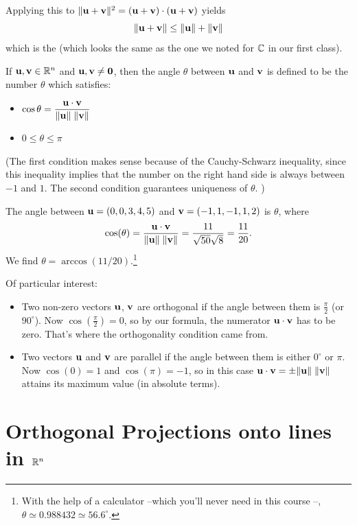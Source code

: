 Applying this to $\Vert \mathbf{u} + \mathbf{v} \Vert^2 = (\mathbf{u} + \mathbf{v})\cdot(\mathbf{u}+\mathbf{v})$
yields
$$
\Vert \mathbf{u} + \mathbf{v} \Vert \leq \Vert \mathbf{u} \Vert + \Vert \mathbf{v} \Vert
$$
which is the  (which looks the same as the one we noted for $\mathbb{C}$
in our first class).

\begin{definition}
If $\mathbf{u},\mathbf{v} \in \mathbb{R}^n$ and $\mathbf{u},\mathbf{v} \neq \mathbf{0}$, then the angle
$\theta$ between $\mathbf{u}$ and $\mathbf{v}$ is defined to be the number
$\theta$ which satisfies:
\begin{itemize}
\item $\displaystyle \cos \theta = \frac{\mathbf{u} \cdot \mathbf{v}}{\Vert \mathbf{u} \Vert\; \Vert \mathbf{v} \Vert}$
\item $0 \leq \theta \leq \pi$
\end{itemize}
(The first condition makes sense because
of the Cauchy-Schwarz inequality, since this inequality implies that the number on the right hand
side is always between $-1$ and $1$. The second condition guarantees uniqueness of $\theta$. )
\end{definition}

\begin{myexample}
The angle between $\mathbf{u} = (0,0,3,4,5)$ and $\mathbf{v} = (-1,1,-1,1,2)$
is $\theta$, where
$$
\cos(\theta) = \frac{\mathbf{u} \cdot \mathbf{v}}{\Vert \mathbf{u} \Vert\; \Vert \mathbf{v} \Vert}
= \frac{11}{\sqrt{50}\sqrt{8}} = \frac{11}{20}.
$$
 We find $\theta = \arccos(11/20)$.\footnote{With the help of a calculator --which you'll never need in this course --, $\theta \simeq 0.988432\simeq56.6^\circ$.}
\end{myexample}

Of particular interest:
\begin{itemize}
\item Two non-zero vectors $\mathbf{u}$, $\mathbf{v}$ are orthogonal if the angle between
them is $\frac{\pi}2$ (or $90^\circ$).  Now $\cos(\frac{\pi}2) = 0$, so by our formula,
the numerator $\mathbf{u} \cdot \mathbf{v}$ has to be zero.  That's where the
orthogonality condition came from.
\item Two vectors $\mathbf{u}$ and $\mathbf{v}$ are parallel if the angle between
them is either $0^\circ$ or $\pi$.  Now $\cos(0) = 1$ and
$\cos(\pi) = -1$, so in this case $\mathbf{u} \cdot \mathbf{v} = \pm \Vert \mathbf{u} \Vert\; \Vert \mathbf{v} \Vert$ attains its maximum value (in absolute terms).
\end{itemize}

\section{Orthogonal Projections onto lines in \texorpdfstring{$\mathbb{R}^n$}{Rn}}
 
